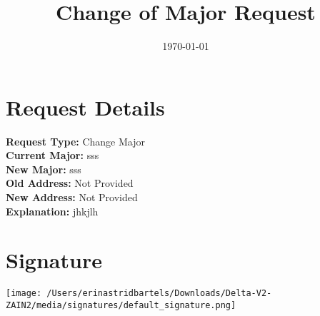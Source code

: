 \documentclass{article}
\begin{document}
\title{Change of Major Request}
\date{\today}

\maketitle



\section*{Request Details}
\textbf{Request Type:} Change Major \\
\textbf{Current Major:} sss \\
\textbf{New Major:} sss \\
\textbf{Old Address:} Not Provided \\
\textbf{New Address:} Not Provided \\
\textbf{Explanation:} jhkjlh

\section*{Signature}
\vspace{1cm}
\texttt{[image: /Users/erinastridbartels/Downloads/Delta-V2-ZAIN2/media/signatures/default\_signature.png]} %
\end{document}
